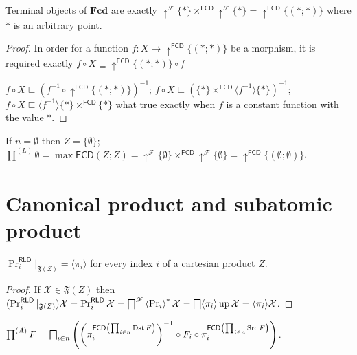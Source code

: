 \begin{prop}
  Terminal objects of $\mathbf{Fcd}$ are exactly
  $\uparrow^{\mathscr{F}} \{ \ast \} \times^{\mathsf{FCD}}
  \uparrow^{\mathscr{F}} \{ \ast \} = \uparrow^{\mathsf{FCD}} \{ (\ast
  ; \ast) \}$ where $\ast$ is an arbitrary point.
\end{prop}

\begin{proof}
  In order for a function $f : X \rightarrow \uparrow^{\mathsf{FCD}} \{
  (\ast ; \ast) \}$ be a morphism, it is required exactly $f \circ X
  \sqsubseteq \uparrow^{\mathsf{FCD}} \{ (\ast ; \ast) \} \circ f$
  
  $f \circ X \sqsubseteq (f^{- 1} \circ \uparrow^{\mathsf{FCD}} \{
  (\ast ; \ast) \})^{- 1}$; $f \circ X \sqsubseteq (\{ \ast \}
  \times^{\mathsf{FCD}} \langle f^{- 1} \rangle \{ \ast \})^{- 1}$; $f
  \circ X \sqsubseteq \langle f^{- 1} \rangle \{ \ast \}
  \times^{\mathsf{FCD}} \{ \ast \}$ what true exactly when $f$ is a
  constant function with the value $\ast$.
\end{proof}

If $n = \emptyset$ then $Z = \{ \emptyset \}$; $\prod^{(L)} \emptyset = \max
\mathsf{FCD} (Z ; Z) = \uparrow^{\mathscr{F}} \{ \emptyset \}
\times^{\mathsf{FCD}} \uparrow^{\mathscr{F}} \{ \emptyset \} =
\uparrow^{\mathsf{FCD}} \{ (\emptyset ; \emptyset) \}$.


\section{Canonical product and subatomic product}


\begin{prop}
  $\Pr^{\mathsf{RLD}}_i |_{\mathfrak{F} (Z)} = \langle \pi_i \rangle$
  for every index $i$ of a cartesian product $Z$.
\end{prop}

\begin{proof}
  If $\mathcal{X} \in \mathfrak{F} (Z)$ then $(\Pr^{\mathsf{RLD}}_i
  |_{\mathfrak{F} (Z)}) \mathcal{X} = \Pr^{\mathsf{RLD}}_i  \mathcal{X}
  = \bigsqcap^{\mathscr{F}} \left\langle \Pr_i\right\rangle ^{\ast} \mathcal{X} =
  \bigsqcap \langle \pi_i \rangle \operatorname{up} \mathcal{X} = \langle \pi_i
  \rangle \mathcal{X}$.
\end{proof}

\begin{prop}
  $\prod^{(A)} F = \bigsqcap_{i \in n} \left( \left( \pi^{\mathsf{FCD}
  \left( \prod_{i \in n} \operatorname{Dst} F \right)}_i \right)^{- 1} \circ F_i \circ
  \pi^{\mathsf{FCD} \left( \prod_{i \in n} \operatorname{Src} F \right)}_i
  \right)$.
\end{prop}

